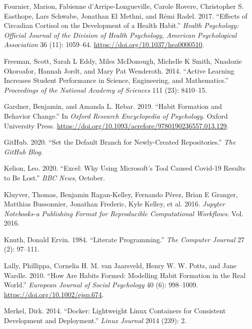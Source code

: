 \documentclass{article}
\newlength{\cslhangindent}
\newenvironment{CSLReferences}[2] %
 {%
  \setlength{\parindent}{0pt}
  \ifodd #1 \everypar{\setlength{\hangindent}{\cslhangindent}}\ignorespaces\fi
  \ifnum #2 > 0
  \setlength{\parskip}{#2\baselineskip}
  \fi
 }%
 {}
\begin{document}
\begin{CSLReferences}{1}{0}
\leavevmode{}%
Fournier, Marion, Fabienne d'Arripe-Longueville, Carole Rovere,
Christopher S. Easthope, Lars Schwabe, Jonathan El Methni, and Rémi
Radel. 2017. {``Effects of Circadian Cortisol on the Development of a
Health Habit.''} \emph{Health Psychology: Official Journal of the
Division of Health Psychology, American Psychological Association} 36
(11): 1059--64. \url{https://doi.org/10.1037/hea0000510}.

\leavevmode{}%
Freeman, Scott, Sarah L Eddy, Miles McDonough, Michelle K Smith,
Nnadozie Okoroafor, Hannah Jordt, and Mary Pat Wenderoth. 2014.
{``Active Learning Increases Student Performance in Science,
Engineering, and Mathematics.''} \emph{Proceedings of the National
Academy of Sciences} 111 (23): 8410--15.

\leavevmode{}%
Gardner, Benjamin, and Amanda L. Rebar. 2019. {``Habit {Formation} and
{Behavior Change}.''} In \emph{Oxford {Research Encyclopedia} of
{Psychology}}. {Oxford University Press}.
\url{https://doi.org/10.1093/acrefore/9780190236557.013.129}.

\leavevmode{}%
GitHub. 2020. {``Set the Default Branch for Newly-Created
Repositories.''} \emph{The GitHub Blog}.

\leavevmode{}%
Kelion, Leo. 2020. {``Excel: {Why} Using {Microsoft}'s Tool Caused
{Covid}-19 Results to Be Lost.''} \emph{BBC News}, October.

\leavevmode{}%
Kluyver, Thomas, Benjamin Ragan-Kelley, Fernando Pérez, Brian E Granger,
Matthias Bussonnier, Jonathan Frederic, Kyle Kelley, et al. 2016.
\emph{Jupyter Notebooks-a Publishing Format for Reproducible
Computational Workflows.} Vol. 2016.

\leavevmode{}%
Knuth, Donald Ervin. 1984. {``Literate Programming.''} \emph{The
Computer Journal} 27 (2): 97--111.

\leavevmode{}%
Lally, Phillippa, Cornelia H. M. van Jaarsveld, Henry W. W. Potts, and
Jane Wardle. 2010. {``How Are Habits Formed: {Modelling} Habit Formation
in the Real World.''} \emph{European Journal of Social Psychology} 40
(6): 998--1009. \url{https://doi.org/10.1002/ejsp.674}.

\leavevmode{}%
Merkel, Dirk. 2014. {``Docker: Lightweight Linux Containers for
Consistent Development and Deployment.''} \emph{Linux Journal} 2014
(239): 2.


\end{CSLReferences}
\end{document}
